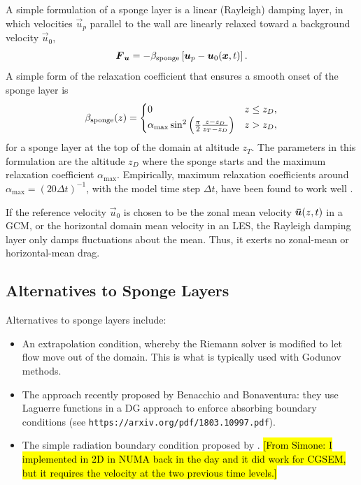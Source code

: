 \documentclass{report}
\begin{document}
A simple formulation of a sponge layer is a linear (Rayleigh) damping layer, in which velocities $\vec{u}_p$ parallel to the wall are linearly relaxed toward a background velocity $\vec{u}_0$,
\begin{equation*}
\vec{F}_{\vec{u}} = -\beta_{\rm sponge} \left[\vec{u}_p - \vec{u}_0(\vec{x}, t)\right].
\end{equation*}
A simple form of the relaxation coefficient that ensures a smooth onset of the sponge layer is \citep{klemp:1978a}
\begin{equation}\label{e:spongeDurran}
\beta_{\rm sponge}(z) =  
  \begin{cases}
    0 &  z\leq z_D,\\
    \alpha_{\max} \sin^2 \left( \frac{\pi}{2}\frac{z - z_D}{z_T - z_D} \right) & z > z_D,
    \end{cases}
\end{equation}
for a sponge layer at the top of the domain at altitude $z_T$. The parameters in this formulation are the altitude $z_D$ where the sponge starts and the maximum relaxation coefficient $\alpha_{\max}$. Empirically, maximum relaxation coefficients around $\alpha_{\max} = (20 \Delta t)^{-1}$, with the model time step $\Delta t$, have been found to work well \citep{Jablonowski11a}.

If the reference velocity $\vec{u}_0$ is chosen to be the zonal mean velocity $\vec{\Bar u}(z, t)$ in a GCM, or the horizontal domain mean velocity in an LES, the Rayleigh damping layer only damps fluctuations about the mean. Thus, it exerts no zonal-mean or horizontal-mean drag.  

\subsection{Alternatives to Sponge Layers}

Alternatives to sponge layers include:
 \begin{itemize}
    \item An extrapolation condition, whereby the Riemann solver is modified to let flow move out of the domain. This is what is typically used with Godunov methods. 
    \item The approach recently proposed by Benacchio and Bonaventura: they use Laguerre functions in a DG approach to enforce absorbing boundary conditions (see \texttt{https://arxiv.org/pdf/1803.10997.pdf}).
    \item The simple radiation boundary condition proposed by \cite{orlanski1979}. \hl{[From Simone: I implemented in 2D in NUMA back in the day and it did work for CGSEM, but it requires the velocity at the two previous time levels.]}
\end{itemize}
    
\end{document}
